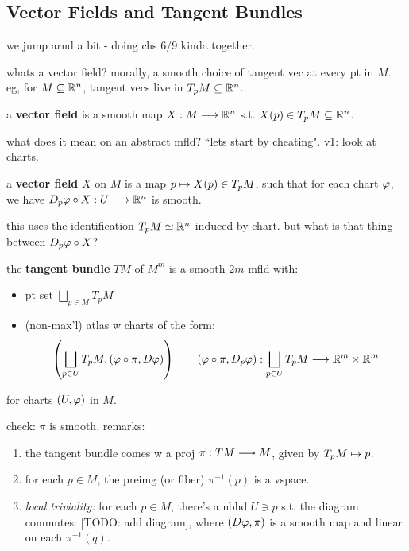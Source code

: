 \subsection{Vector Fields and Tangent Bundles}
we jump arnd a bit - doing chs 6/9 kinda together.

whats a vector field? morally, a smooth choice of tangent vec at every pt in $M$.
eg, for $M\subseteq\mathbb{R}^{n}$, tangent vecs live in $T_{p}M\subseteq\mathbb{R}^{n}$.

\begin{defn}
	a \textbf{vector field} is a smooth map $X:M\longrightarrow\mathbb{R}^{n}$ s.t.
	$X(p)\in T_{p}M\subseteq\mathbb{R}^{n}$.
\end{defn}
what does it mean on an abstract mfld? ``lets start by cheating".
v1: look at charts.

\begin{defn}
	a \textbf{vector field} $X$ on $M$ is a map $p\mapsto X(p)\in T_{p}M$, such that
	for each chart $\varphi$, we have $D_{p}\varphi\circ X:U\longrightarrow\mathbb{R}^{n}$ is smooth.
\end{defn}
this uses the identification $T_{p}M\simeq\mathbb{R}^{n}$ induced by chart.
but what is that thing between $D_{p}\varphi\circ X$?

\begin{defn}
	the \textbf{tangent bundle} $TM$ of $M^{m}$ is a smooth $2m$-mfld with:
	\begin{itemize}
		\item pt set $\bigsqcup_{p\in M}T_{p}M$
		\item (non-max'l) atlas w charts of the form:
			\begin{equation*}
				\left(\bigsqcup_{p\in U}T_{p}M,(\varphi\circ\pi,D\varphi)\right) \qquad
				(\varphi\circ\pi,D_{p}\varphi):\bigsqcup_{p\in U}T_{p}M\longrightarrow\mathbb{R}^{m}\times\mathbb{R}^{m}
			\end{equation*}
	\end{itemize}
	for charts $(U,\varphi)$ in $M$.
\end{defn}
check: $\pi$ is smooth. remarks:
\begin{enumerate}[(1)]
	\item the tangent bundle comes w a proj $\pi:TM\longrightarrow M$, given by $T_{p}M\mapsto p$.
	\item for each $p\in M$, the preimg (or fiber) $\pi^{-1}(p)$ is a vspace.
	\item \textit{local triviality:} for each $p\in M$, there's a nbhd $U\ni p$ s.t. the diagram commutes:
		[TODO: add diagram], where $(D\varphi,\pi)$ is a smooth map and
		linear on each $\pi^{-1}(q)$.
\end{enumerate}

